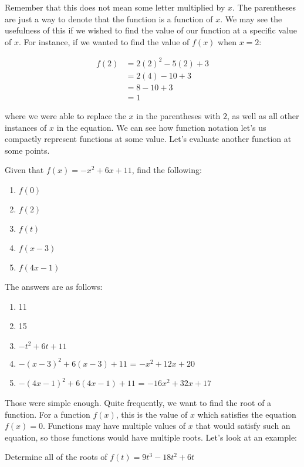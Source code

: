 \documentclass[12pt]{article}
\begin{document}
Remember that this does not mean some letter multiplied by $x$.
The parentheses are just a way to denote that the function is a function of $x$.
We may see the usefulness of this if we wished to find the value of our function at a specific value of $x$.
For instance, if we wanted to find the value of $f(x)$ when $x = 2$:

\begin{align*}
    f(2) & = 2(2)^2-5(2)+3 \\
         & = 2(4)-10+3     \\
         & = 8-10+3        \\
         & = 1
\end{align*}

where we were able to replace the $x$ in the parentheses with $2$, as well as all other instances of $x$ in the equation.
We can see how function notation let's us compactly represent functions at some value.
Let's evaluate another function at some points.

Given that $f(x) = -x^2+6x+11$, find the following:

\begin{enumerate}
    \item $f(0)$
    \item $f(2)$
    \item $f(t)$
    \item $f(x-3)$
    \item $f(4x-1)$
\end{enumerate}

The answers are as follows:

\begin{enumerate}
    \item 11
    \item 15
    \item $-t^2+6t+11$
    \item $-(x-3)^2+6(x-3)+11$ = $-x^2+12x+20$
    \item $-(4x-1)^2+6(4x-1)+11$ = $-16x^2+32x+17$
\end{enumerate}

Those were simple enough.
Quite frequently, we want to find the root of a function.
For a function $f(x)$, this is the value of $x$ which satisfies the equation $f(x)=0$.
Functions may have multiple values of $x$ that would satisfy such an equation, so those functions would have multiple roots.
Let's look at an example:

Determine all of the roots of $f(t) = 9t^3 - 18t^2 + 6t$
\end{document}
